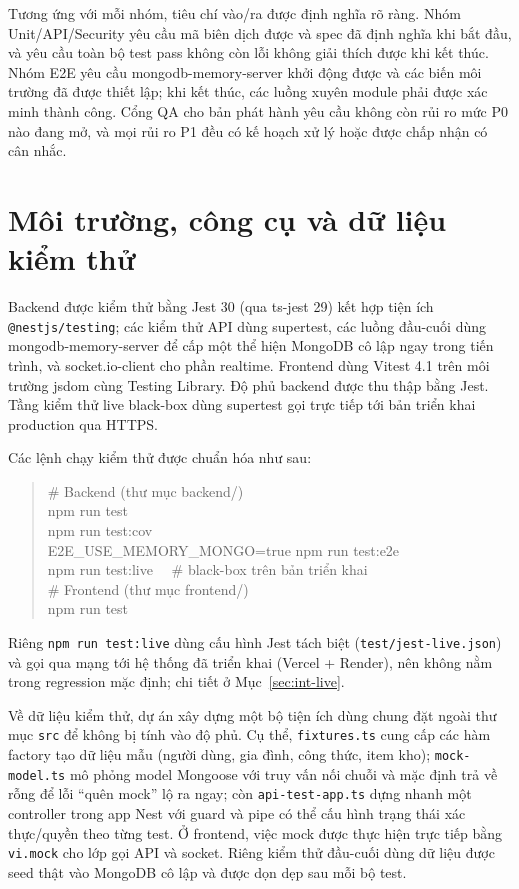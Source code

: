 \documentclass[12pt,a4paper]{article}
\newcommand{\code}[1]{\texttt{#1}}
\begin{document}
Tương ứng với mỗi nhóm, tiêu chí vào/ra được định nghĩa rõ ràng. Nhóm Unit/API/Security yêu cầu mã biên dịch
được và spec đã định nghĩa khi bắt đầu, và yêu cầu toàn bộ test pass không còn lỗi không giải thích được khi
kết thúc. Nhóm E2E yêu cầu mongodb-memory-server khởi động được và các biến môi trường đã được thiết lập;
khi kết thúc, các luồng xuyên module phải được xác minh thành công. Cổng QA cho bản phát hành yêu cầu không
còn rủi ro mức P0 nào đang mở, và mọi rủi ro P1 đều có kế hoạch xử lý hoặc được chấp nhận có cân nhắc.

\section{Môi trường, công cụ và dữ liệu kiểm thử}

Backend được kiểm thử bằng Jest 30 (qua ts-jest 29) kết hợp tiện ích \code{@nestjs/testing}; các kiểm thử
API dùng supertest, các luồng đầu-cuối dùng mongodb-memory-server để cấp một thể hiện MongoDB cô lập ngay
trong tiến trình, và socket.io-client cho phần realtime. Frontend dùng Vitest 4.1 trên môi trường jsdom
cùng Testing Library. Độ phủ backend được thu thập bằng Jest. Tầng kiểm thử live black-box dùng supertest gọi
trực tiếp tới bản triển khai production qua HTTPS.

Các lệnh chạy kiểm thử được chuẩn hóa như sau:

\begin{quote}\ttfamily\small
\# Backend (thư mục backend/)\\
npm run test\\
npm run test:cov\\
E2E\_USE\_MEMORY\_MONGO=true npm run test:e2e\\
npm run test:live \ \ \# black-box trên bản triển khai\\[4pt]
\# Frontend (thư mục frontend/)\\
npm run test
\end{quote}

Riêng \code{npm run test:live} dùng cấu hình Jest tách biệt (\code{test/jest-live.json}) và gọi qua mạng tới
hệ thống đã triển khai (Vercel + Render), nên không nằm trong regression mặc định; chi tiết ở
Mục~\ref{sec:int-live}.

Về dữ liệu kiểm thử, dự án xây dựng một bộ tiện ích dùng chung đặt ngoài thư mục \code{src} để không bị tính
vào độ phủ. Cụ thể, \code{fixtures.ts} cung cấp các hàm factory tạo dữ liệu mẫu (người dùng, gia đình, công
thức, item kho); \code{mock-model.ts} mô phỏng model Mongoose với truy vấn nối chuỗi và mặc định trả về rỗng
để lỗi ``quên mock'' lộ ra ngay; còn \code{api-test-app.ts} dựng nhanh một controller trong app Nest với
guard và pipe có thể cấu hình trạng thái xác thực/quyền theo từng test. Ở frontend, việc mock được thực hiện
trực tiếp bằng \code{vi.mock} cho lớp gọi API và socket. Riêng kiểm thử đầu-cuối dùng dữ liệu được seed thật
vào MongoDB cô lập và được dọn dẹp sau mỗi bộ test.
\end{document}
